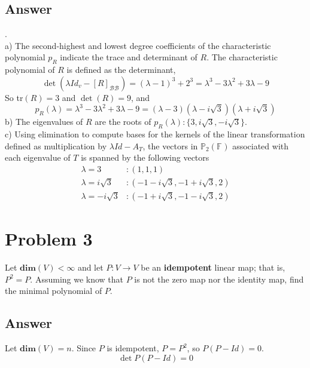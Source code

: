 \documentclass[
	12pt, %
]{fphw}
\newcommand\0{\mathbf{0}}
\newcommand\set[1]{\{#1\}}
\newcommand\F[1]{\text{$\mathbb{F}^{#1}$}}
\newcommand\B[1]{\text{$\mathcal{B}_{#1}$}}
\newcommand\poly[1]{\text{$\mathbb{P}_{#1}(\F{})$}}
\renewcommand\dim[1]{\mathbf{dim}(#1)}
\begin{document}
\subsection*{Answer} .\\
a) The second-highest and lowest degree coefficients of the characteristic polynomial $p_R$ indicate the trace and determinant of $R$. The characteristic polynomial of $R$ is defined as the determinant,
\begin{equation*}
\det(\lambda Id_v - [R]_{\B{}\B{}}) = (\lambda - 1)^3 + 2^3 = \lambda^3 - 3 \lambda^2 +3 \lambda - 9
\end{equation*}
So tr$(R) = 3$ and $\det(R) = 9$, and
$$
p_R(\lambda) = \lambda^3 - 3 \lambda^2 + 3 \lambda - 9 = (\lambda - 3)(\lambda - i \sqrt{3})(\lambda + i \sqrt{3})
$$
b) The eigenvalues of $R$ are the roots of $p_R(\lambda) : \set{3, i\sqrt{3}, -i \sqrt{3}}$.\\
c) Using elimination to compute bases for the kernels of the linear transformation defined as multiplication by $\lambda Id - A_T$, the vectors in $\poly{2}$ associated with each eigenvalue of $T$ is spanned by the following vectors
\begin{align*}
\lambda = 3 &: (1,1,1)\\
\lambda = i\sqrt{3} &: (-1-i \sqrt 3, -1 + i \sqrt 3, 2)\\
\lambda = -i\sqrt{3} &: (-1+i \sqrt 3, -1 - i \sqrt 3, 2)
\end{align*}
\newpage

\section*{Problem 3}
\begin{problem}
Let $\dim{V} < \infty$ and let $P: V \to V$ be an \textbf{idempotent} linear map; that is, $P^2 = P$. Assuming we know that $P$ is not the zero map nor the identity map, find the minimal polynomial of $P$.
\end{problem}

\subsection*{Answer} Let $\dim V = n$. Since $P$ is idempotent, $P = P^2$, so $P(P - Id) = 0$.
$$
\det P(P - Id) = 0
$$
\end{document}

